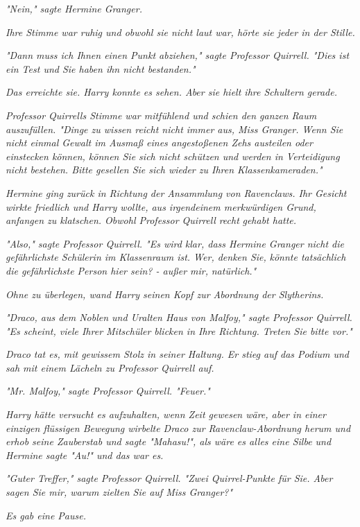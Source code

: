 {\emph{"Nein," sagte Hermine Granger.}

\emph{Ihre Stimme war ruhig und obwohl sie nicht laut war, hörte sie jeder in der Stille.}

\emph{"Dann muss ich Ihnen einen Punkt abziehen," sagte Professor Quirrell. "Dies ist ein Test und Sie haben ihn nicht bestanden."}

\emph{Das erreichte sie. Harry konnte es sehen. Aber sie hielt ihre Schultern gerade.}

\emph{Professor Quirrells Stimme war mitfühlend und schien den ganzen Raum auszufüllen. "Dinge zu wissen reicht nicht immer aus, Miss Granger. Wenn Sie nicht einmal Gewalt im Ausmaß eines angestoßenen Zehs austeilen oder einstecken können, können Sie sich nicht schützen und werden in Verteidigung nicht bestehen. Bitte gesellen Sie sich wieder zu Ihren Klassenkameraden."}

\emph{Hermine ging zurück in Richtung der Ansammlung von Ravenclaws. Ihr Gesicht wirkte friedlich und Harry wollte, aus irgendeinem merkwürdigen Grund, anfangen zu klatschen. Obwohl Professor Quirrell} \emph{\emph{recht}} \emph{gehabt hatte.}

\emph{"Also," sagte Professor Quirrell. "Es wird klar, dass Hermine Granger nicht die gefährlichste Schülerin im Klassenraum ist. Wer, denken Sie,} \emph{könnte tatsächlich die gefährlichste Person hier sein? - außer mir,} \emph{natürlich."}

\emph{Ohne zu überlegen, wand Harry seinen Kopf zur Abordnung der Slytherins.}

\emph{"Draco, aus dem Noblen und Uralten Haus von Malfoy," sagte Professor Quirrell. "Es scheint, viele Ihrer Mitschüler blicken in Ihre Richtung. Treten Sie bitte vor."}

\emph{Draco tat es, mit gewissem Stolz in seiner Haltung. Er stieg auf das Podium und sah mit einem Lächeln zu Professor Quirrell auf.}

\emph{"Mr. Malfoy," sagte Professor Quirrell. "Feuer."}

\emph{Harry hätte versucht es aufzuhalten, wenn Zeit gewesen wäre, aber in einer einzigen flüssigen Bewegung wirbelte Draco zur Ravenclaw-Abordnung herum und erhob seine Zauberstab und sagte "\emph{Mahasu!}", als wäre es alles eine Silbe und Hermine sagte "Au!" und das war es.}

\emph{"Guter Treffer," sagte Professor Quirrell. "Zwei Quirrel-Punkte für Sie. Aber sagen Sie mir, warum zielten Sie auf Miss Granger?"}

\emph{Es gab eine Pause.}

}
